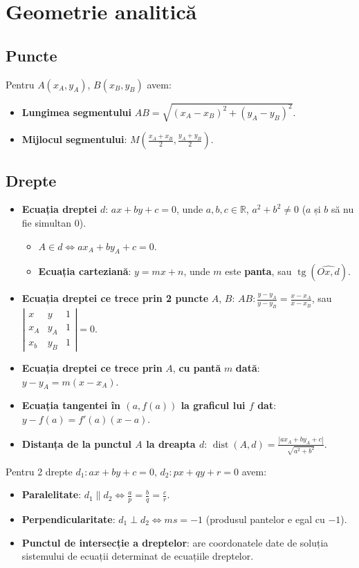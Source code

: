\documentclass{article}
\DeclareMathOperator{\tg}{tg}
\DeclareMathOperator{\dist}{dist}
\begin{document}
\section*{Geometrie analitică}
\subsection*{Puncte}
Pentru $A(x_A, y_A)$, $B(x_B, y_B)$ avem:
\begin{itemize}
    \item \textbf{Lungimea segmentului} $AB = \sqrt{(x_A-x_B)^2+(y_A-y_B)^2}$.
    \item \textbf{Mijlocul segmentului}: $M(\frac{x_A+x_B}{2}, \frac{y_A+y_B}{2})$.
\end{itemize}
\subsection*{Drepte}
\begin{itemize}
    \item \textbf{Ecuația dreptei} $d$: $ax + by + c = 0$, unde $a, b, c \in \mathbb{R}$, $a^2+b^2 \neq 0$ ($a$ și $b$ să nu fie simultan $0$).
    \begin{itemize}
        \item $A \in d \iff ax_A + by_A +c = 0$.
        \item \textbf{Ecuația carteziană}: $y = mx + n$, unde $m$ este \textbf{panta}, sau $\tg(\widehat{Ox, d})$.
    \end{itemize}
    \item \textbf{Ecuația dreptei ce trece prin 2 puncte} $A$, $B$: $AB: \frac{y-y_A}{y-y_B}=\frac{x-x_A}{x-x_B}$, sau $\left|\begin{matrix}
        x & y & 1 \\
        x_A & y_A & 1 \\
        x_b & y_B & 1
    \end{matrix}\right| = 0$.
    \item \textbf{Ecuația dreptei ce trece prin} $A$, \textbf{cu pantă} $m$ \textbf{dată}: $y-y_A = m(x-x_A)$.
    \item \textbf{Ecuația tangentei în $(a, f(a))$ la graficul lui $f$ dat}: $y-f(a)=f'(a)(x-a)$.
    \item \textbf{Distanța de la punctul $A$ la dreapta $d$}: $\dist(A, d)=\frac{|ax_A+by_A+c|}{\sqrt{a^2+b^2}}$.
\end{itemize}
Pentru 2 drepte $d_1 : ax+by+c=0$, $d_2 : px+qy+r=0$ avem:
\begin{itemize}
    \item \textbf{Paralelitate}: $d_1 \parallel d_2 \iff \frac{a}{p} = \frac{b}{q} = \frac{c}{r}$.
    \item \textbf{Perpendicularitate}: $d_1 \perp d_2 \iff ms=-1$ (produsul pantelor e egal cu $-1$).
    \item \textbf{Punctul de intersecție a dreptelor}: are coordonatele date de soluția sistemului de ecuații determinat de ecuațiile dreptelor.
\end{itemize}
\end{document}
